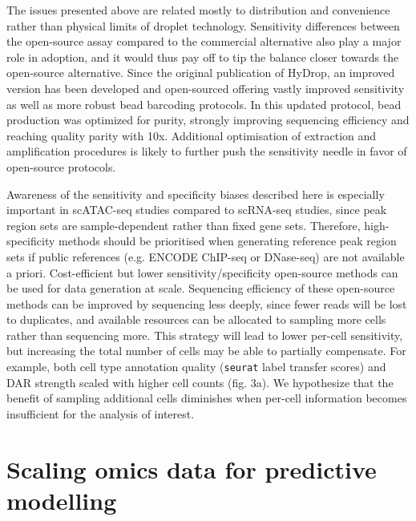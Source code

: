 The issues presented above are related mostly to distribution and convenience rather than physical limits of droplet technology. Sensitivity differences between the open-source assay compared to the commercial alternative also play a major role in adoption, and it would thus pay off to tip the balance closer towards the open-source alternative. Since the original publication of HyDrop, an improved version has been developed and open-sourced offering vastly improved sensitivity as well as more robust bead barcoding protocols. In this updated protocol, bead production was optimized for purity, strongly improving sequencing efficiency and reaching quality parity with 10x. Additional optimisation of extraction and amplification procedures is likely to further push the sensitivity needle in favor of open-source protocols.

Awareness of the sensitivity and specificity biases described here is especially important in scATAC-seq studies compared to scRNA-seq studies, since peak region sets are sample-dependent rather than fixed gene sets. Therefore, high-specificity methods should be prioritised when generating reference peak region sets if public references (e.g. ENCODE ChIP-seq or DNase-seq) are not available a priori. Cost-efficient but lower sensitivity/specificity open-source methods can be used for data generation at scale. Sequencing efficiency of these open-source methods can be improved by sequencing less deeply, since fewer reads will be lost to duplicates, and available resources can be allocated to sampling more cells rather than sequencing more. This strategy will lead to lower per-cell sensitivity, but increasing the total number of cells may be able to partially compensate. For example, both cell type annotation quality (\verb|seurat| label transfer scores) and DAR strength scaled with higher cell counts (fig. 3a). We hypothesize that the benefit of sampling additional cells diminishes when per-cell information becomes insufficient for the analysis of interest.

\section{Scaling omics data for predictive modelling}

